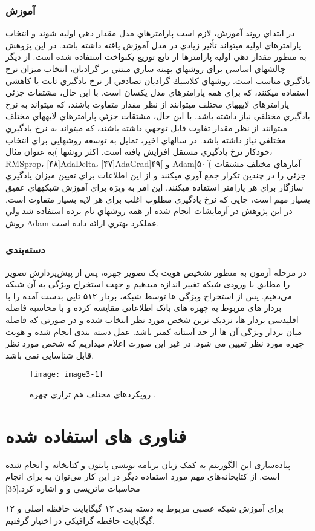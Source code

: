\subsubsection{آموزش‌}
در ابتداي روند آموزش، لازم است پارامترهاي مدل مقدار دهي اوليه شوند و انتخاب پارامترهاي اوليه ميتواند تأثير زيادي در مدل آموزش يافته داشته باشد. در اين پژوهش به منظور مقدار دهي اوليه پارامترها از تابع توزيع يكنواخت استفاده شده است. از ديگر چالشهاي اساسي براي روشهاي بهينه سازي مبتني بر گراديان، انتخاب ميزان نرخ يادگيري مناسب است. روشهاي كلاسيك گراديان تصادفي از نرخ يادگيري ثابت يا كاهشي استفاده ميكنند، كه براي همه پارامترهاي مدل يكسان است. با اين حال، مشتقات جزئي پارامترهاي لايههاي مختلف ميتوانند از نظر مقدار متفاوت باشند، كه ميتواند به نرخ يادگيري مختلفي نياز داشته باشد. با اين حال، مشتقات جزئي پارامترهاي لايههاي مختلف ميتوانند از نظر مقدار تفاوت قابل توجهي داشته باشند، كه ميتواند به نرخ يادگيري مختلفي نياز داشته باشد. در سالهاي اخير، تمايل به توسعه روشهايي براي انتخاب خودكار نرخ يادگيري مستقل افزايش يافته است. اكثر روشها )به عنوان مثال، RMSprop، [۴۸]AdaDelta، [۴۷]AdaGrad]۴۹[ و Adam]۵۰[( آمارهاي مختلف مشتقات جزئي را در چندين تكرار جمع آوري ميكنند و از اين اطلاعات براي تعيين ميزان يادگيري سازگار براي هر پارامتر استفاده ميكنند. اين امر به ويژه براي آموزش شبكههاي عميق بسيار مهم است، جايي كه نرخ يادگيري مطلوب اغلب براي هر لايه بسيار متفاوت است. در اين پژوهش در آزمايشات انجام شده از همه روشهاي نام برده استفاده شد ولي روش Adam عملكرد بهتري ارائه داده است.

\subsubsection{دسته‌بندی}
در مرحله آزمون به منظور تشخیص هویت یک تصویر چهره، پس از پیش‌پردازش تصویر را مطابق با ورودی شبکه تغییر اندازه میدهیم و جهت استخراج ویژگی‌ به آن شبکه می‌دهیم. پس از استخراج ویژگی ها توسط شبکه، بردار ۵۱۲ تایی بدست آمده را با بردار های مربوط به چهره های بانک اطلاعاتی مقایسه کرده و با محاسبه فاصله اقلیدسی بردار ها، نزدیک ترین شخص مورد نظر انتخاب شده و در صورتی که فاصله میان بردار ویژگی آن ها از حد آستانه کمتر باشد. عمل دسته بندی انجام شده و هویت چهره مورد نظر تعیین می شود. در غیر این صورت اعلام میداریم که شخص مورد نظر قابل شناسایی نمی باشد.

\begin{figure}[h]
\centering
  \texttt{[image: image3-1]}
  \caption{رویکردهای مختلف هم ترازی چهره \cite{ref1}.}
  \label{image2-1}
\end{figure}

\section{فناوری های استفاده شده}
پیاده‌سازی این الگوریتم به کمک زبان برنامه‌ نویسی پایتون و کتابخانه  و انجام شده است. از کتابخانه‌های مهم مورد استفاده دیگر در این کار می‌‌توان به  برای انجام محاسبات ماتریسی و  و  اشاره کرد.[35] 

برای آموزش شبکه عصبی مربوط به دسته بندی ۱۲ گیگابایت حافظه اصلی و ۱۲ گیگابایت حافظه گرافیکی در اختیار گرفتیم.

